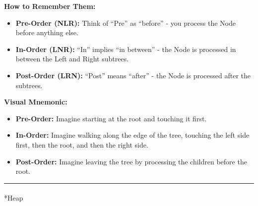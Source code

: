 \documentclass[
  letterpaper,
  DIV=11,
  numbers=noendperiod]{scrreprt}
\makeatletter
\let\oldparagraph\paragraph
\renewcommand{\paragraph}{
    \@ifstar
      \xxxParagraphStar
      \xxxParagraphNoStar
  }
\newcommand{\xxxParagraphStar}[1]{\oldparagraph*{#1}\mbox{}}
\newcommand{\xxxParagraphNoStar}[1]{\oldparagraph{#1}\mbox{}}
\providecommand{\tightlist}{%
  \setlength{\itemsep}{0pt}\setlength{\parskip}{0pt}}
\makeatother
\begin{document}
\begin{tcolorbox}[enhanced jigsaw, colframe=quarto-callout-note-color-frame, toprule=.15mm, bottomrule=.15mm, rightrule=.15mm, colback=white, breakable, arc=.35mm, opacityback=0, left=2mm, leftrule=.75mm]

\vspace{-3mm}\textbf{How to Remember Them:}\vspace{3mm}

\begin{itemize}
\tightlist
\item
  \textbf{Pre-Order (NLR):} Think of ``Pre'' as ``before'' - you process
  the Node before anything else.
\item
  \textbf{In-Order (LNR):} ``In'' implies ``in between'' - the Node is
  processed in between the Left and Right subtrees.
\item
  \textbf{Post-Order (LRN):} ``Post'' means ``after'' - the Node is
  processed after the subtrees.
\end{itemize}

\end{tcolorbox}

\begin{tcolorbox}[enhanced jigsaw, colframe=quarto-callout-note-color-frame, toprule=.15mm, bottomrule=.15mm, rightrule=.15mm, colback=white, breakable, arc=.35mm, opacityback=0, left=2mm, leftrule=.75mm]

\vspace{-3mm}\textbf{Visual Mnemonic:}\vspace{3mm}

\begin{itemize}
\tightlist
\item
  \textbf{Pre-Order:} Imagine starting at the root and touching it
  first.
\item
  \textbf{In-Order:} Imagine walking along the edge of the tree,
  touching the left side first, then the root, and then the right side.
\item
  \textbf{Post-Order:} Imagine leaving the tree by processing the
  children before the root.
\end{itemize}

\end{tcolorbox}

\begin{center}\rule{0.5\linewidth}{0.5pt}\end{center}

\paragraph*{Heap}\label{heap}
\end{document}
